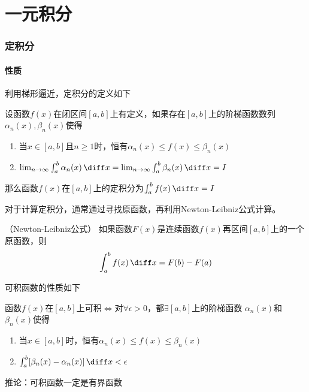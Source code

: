 \part{一元积分}

\section{定积分}
\subsection{性质}
利用梯形逼近，定积分的定义如下
\begin{definition}
    设函数$f(x)$在闭区间$[a,b]$上有定义，如果存在$[a,b]$上的阶梯函数数列$\alpha_n(x),\beta_n(x)$使得
    \begin{enumerate}[(1)]
        \item 当$x\in[a,b]$且$n\geq 1$时，恒有$\alpha_n(x)\leq f(x)\leq \beta_n(x)$
        \item $\lim_{n\to\infty} \int_a^b \alpha_n(x)\, \diff x = \lim_{n\to\infty}\int_a^b \beta_n(x)\, \diff x = I$
    \end{enumerate}
    那么函数$f(x)$在$[a,b]$上的定积分为$\int_a^b f(x)\, \diff x = I$
\end{definition}

对于计算定积分，通常通过寻找原函数，再利用Newton-Leibniz公式计算。
\begin{theorem}
    （Newton-Leibniz公式）
    \label{th:Newton-Leibniz公式}
    如果函数$F(x)$是连续函数$f(x)$再区间$[a,b]$上的一个原函数，则
    \[ \int_a^bf(x)\,\diff x = F(b)-F(a) \]
\end{theorem}

可积函数的性质如下
\begin{theorem}
    函数$f(x)$在$[a,b]$上可积$\iff$对$\forall \epsilon > 0$，都$\exists [a,b]$上的阶梯函数
    $\alpha_n(x)$和$\beta_n(x)$使得
    \begin{enumerate}[(1)]
        \item 当$x\in[a,b]$时，恒有$\alpha_n(x)\leq f(x)\leq \beta_n(x)$
        \item $\int_a^b [\beta_n(x)-\alpha_n(x)] \, \diff x < \epsilon$
    \end{enumerate}
    推论：可积函数一定是有界函数
\end{theorem}

